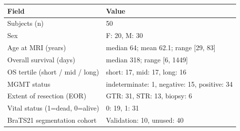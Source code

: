 \begin{tabular}{l l}
\hline
\textbf{Field} & \textbf{Value} \\
\hline
Subjects (n) & 50 \\
Sex & F: 20, M: 30 \\
Age at MRI (years) & median 64; mean 62.1; range [29, 83] \\
Overall survival (days) & median 318; range [6, 1449] \\
OS tertile (short / mid / long) & short: 17, mid: 17, long: 16 \\
MGMT status & indeterminate: 1, negative: 15, positive: 34 \\
Extent of resection (EOR) & GTR: 31, STR: 13, biopsy: 6 \\
Vital status (1=dead, 0=alive) & 0: 19, 1: 31 \\
BraTS21 segmentation cohort & Validation: 10, unused: 40 \\
\hline
\end{tabular}
